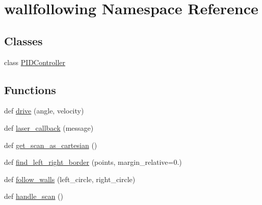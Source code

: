 \hypertarget{namespacewallfollowing}{}\section{wallfollowing Namespace Reference}
\label{namespacewallfollowing}
\subsection*{Classes}
\begin{DoxyCompactItemize}
\item 
class \hyperlink{classwallfollowing_1_1_p_i_d_controller}{P\+I\+D\+Controller}
\end{DoxyCompactItemize}
\subsection*{Functions}
\begin{DoxyCompactItemize}
\item 
def \hyperlink{namespacewallfollowing_a66b98adda1f5c1ba1ed6c0029a5d27f6}{drive} (angle, velocity)
\item 
def \hyperlink{namespacewallfollowing_abaea68d69064fe86d2badf8535dd35a4}{laser\+\_\+callback} (message)
\item 
def \hyperlink{namespacewallfollowing_a31cb307c96c7aac244353e90506342cf}{get\+\_\+scan\+\_\+as\+\_\+cartesian} ()
\item 
def \hyperlink{namespacewallfollowing_a85455c82dd12c297c8cbc3227c1ba598}{find\+\_\+left\+\_\+right\+\_\+border} (points, margin\+\_\+relative=0.)
\item 
def \hyperlink{namespacewallfollowing_a4b2e06015971d569a9e05eb263ae210b}{follow\+\_\+walls} (left\+\_\+circle, right\+\_\+circle)
\item 
def \hyperlink{namespacewallfollowing_a3db0ade925064bd6564f1db9ef4ebec1}{handle\+\_\+scan} ()
\end{DoxyCompactItemize}

